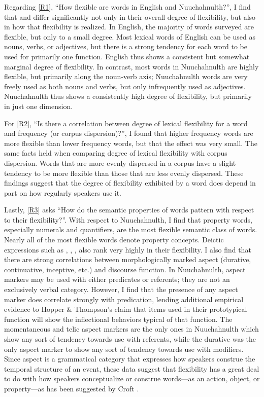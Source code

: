 Regarding \ref{R1}, \enquote{How flexible are words in English and Nuuchahnulth?}, I find that  and  differ significantly not only in their overall degree of flexibility, but also in how that flexibility is realized. In English, the majority of words surveyed are flexible, but only to a small degree. Most lexical words of English can be used as nouns, verbs, or adjectives, but there is a strong tendency for each word to be used for primarily one function. English thus shows a consistent but somewhat marginal degree of flexibility. In contrast, most words in Nuuchahnulth are highly flexible, but primarily along the noun-verb axis; Nuuchahnulth words are very freely used as both nouns and verbs, but only infrequently used as adjectives. Nuuchahnulth thus shows a consistently high degree of flexibility, but primarily in just one dimension.

For \ref{R2}, \enquote{Is there a correlation between degree of lexical flexibility for a word and frequency (or corpus dispersion)?}, I found that higher frequency words are more flexible than lower frequency words, but that the effect was very small. The same facts held when comparing degree of lexical flexibility with corpus dispersion. Words that are more evenly dispersed in a corpus have a slight tendency to be more flexible than those that are less evenly dispersed. These findings suggest that the degree of flexibility exhibited by a word does depend in part on how regularly speakers use it.

Lastly, \ref{R3} asks \enquote{How do the semantic properties of words pattern with respect to their flexibility?}. With respect to Nuuchahnulth, I find that property words, especially numerals and quantifiers, are the most flexible semantic class of words. Nearly all of the most flexible words denote property concepts. Deictic expressions such as , , ,  also rank very highly in their flexibility. I also find that there are strong correlations between morphologically marked aspect (durative, continuative, inceptive, etc.) and discourse function. In Nuuchahnulth, aspect markers may be used with either predicates or referents; they are not an exclusively verbal category. However, I find that the presence of any aspect marker does correlate strongly with predication, lending additional empirical evidence to Hopper \& Thompson's \parencite*{HopperThompson1984} claim that items used in their prototypical function will show the inflectional behaviors typical of that function. The momentaneous and telic aspect markers are the only ones in Nuuchahnulth which show any sort of tendency towards use with referents, while the durative was the only aspect marker to show any sort of tendency towards use with modifiers. Since aspect is a grammatical category that expresses how speakers construe the temporal structure of an event, these data suggest that flexibility has a great deal to do with how speakers conceptualize or construe words—as an action, object, or property—as has been suggested by Croft \parencites*[99]{Croft1991}[104]{Croft2001}.

